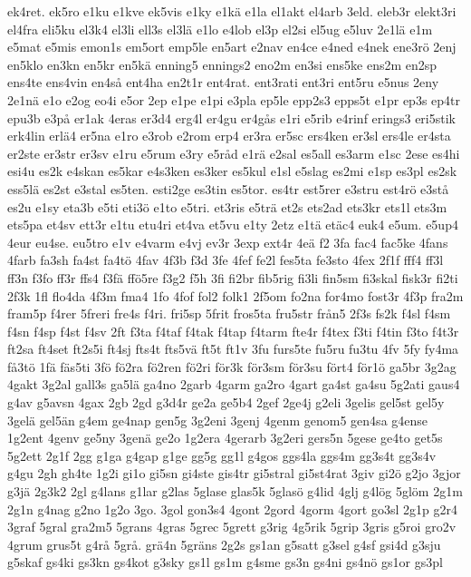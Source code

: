 {ek4ret.
ek5ro
e1ku
e1kve
ek5vis
e1ky
e1kä
e1la
el1akt
el4arb
3eld.
eleb3r
elekt3ri
el4fra
eli5ku
el3k4
el3li
ell3s
el3lä
e1lo
e4lob
el3p
el2si
el5ug
e5luv
2e1lä
e1m
e5mat
e5mis
emon1s
em5ort
emp5le
en5art
e2nav
en4ce
e4ned
e4nek
ene3rö
2enj
en5klo
en3kn
en5kr
en5kä
enning5
ennings2
eno2m
en3si
ens5ke
ens2m
en2sp
ens4te
ens4vin
en4så
ent4ha
en2t1r
ent4rat.
ent3rati
ent3ri
ent5ru
e5nus
2eny
2e1nä
e1o
e2og
eo4i
e5or
2ep
e1pe
e1pi
e3pla
ep5le
epp2s3
epps5t
e1pr
ep3s
ep4tr
epu3b
e3på
er1ak
4eras
er3d4
erg4l
er4gu
er4gås
e1ri
e5rib
e4rinf
erings3
eri5stik
erk4lin
erlä4
er5na
e1ro
e3rob
e2rom
erp4
er3ra
er5sc
ers4ken
er3sl
ers4le
er4sta
er2ste
er3str
er3sv
e1ru
e5rum
e3ry
e5råd
e1rä
e2sal
es5all
es3arm
e1sc
2ese
es4hi
esi4u
es2k
e4skan
es5kar
e4s3ken
es3ker
es5kul
e1sl
e5slag
es2mi
e1sp
es3pl
es2sk
ess5lä
es2st
e3stal
es5ten.
esti2ge
es3tin
es5tor.
es4tr
est5rer
e3stru
est4rö
e3stå
es2u
e1sy
eta3b
e5ti
eti3ö
e1to
e5tri.
et3ris
e5trä
et2s
ets2ad
ets3kr
ets1l
ets3m
ets5pa
et4sv
ett3r
e1tu
etu4ri
et4va
et5vu
e1ty
2etz
e1tä
etäc4
euk4
e5um.
e5up4
4eur
eu4se.
eu5tro
e1v
e4varm
e4vj
ev3r
3exp
ext4r
4eä
f2
3fa
fac4
fac5ke
4fans
4farb
fa3sh
fa4st
fa4tö
4fav
4f3b
f3d
3fe
4fef
fe2l
fes5ta
fe3sto
4fex
2f1f
fff4
ff3l
ff3n
f3fo
ff3r
ffs4
f3fä
ffö5re
f3g2
f5h
3fi
fi2br
fib5rig
fi3li
fin5sm
fi3skal
fisk3r
fi2ti
2f3k
1fl
flo4da
4f3m
fma4
1fo
4fof
fol2
folk1
2f5om
fo2na
for4mo
fost3r
4f3p
fra2m
fram5p
f4rer
5freri
fre4s
f4ri.
fri5sp
5frit
fros5ta
fru5str
från5
2f3s
fs2k
f4sl
f4sm
f4sn
f4sp
f4st
f4sv
2ft
f3ta
f4taf
f4tak
f4tap
f4tarm
fte4r
f4tex
f3ti
f4tin
f3to
f4t3r
ft2sa
ft4set
ft2s5i
ft4sj
fts4t
fts5vä
ft5t
ft1v
3fu
furs5te
fu5ru
fu3tu
4fv
5fy
fy4ma
få3tö
1fä
fäs5ti
3fö
fö2ra
fö2ren
fö2ri
för3k
för3sm
för3su
fört4
för1ö
ga5br
3g2ag
4gakt
3g2al
gall3s
ga5lä
ga4no
2garb
4garm
ga2ro
4gart
ga4st
ga4su
5g2ati
gaus4
g4av
g5avsn
4gax
2gb
2gd
g3d4r
ge2a
ge5b4
2gef
2ge4j
g2eli
3gelis
gel5st
gel5y
3gelä
gel5än
g4em
ge4nap
gen5g
3g2eni
3genj
4genm
genom5
gen4sa
g4ense
1g2ent
4genv
ge5ny
3genä
ge2o
1g2era
4gerarb
3g2eri
gers5n
5gese
ge4to
get5s
5g2ett
2g1f
2gg
g1ga
g4gap
g1ge
gg5g
gg1l
g4gos
ggs4la
ggs4m
gg3s4t
gg3s4v
g4gu
2gh
gh4te
1g2i
gi1o
gi5sn
gi4ste
gis4tr
gi5stral
gi5st4rat
3giv
gi2ö
g2jo
3gjor
g3jä
2g3k2
2gl
g4lans
g1lar
g2las
5glase
glas5k
5glasö
g4lid
4glj
g4lög
5glöm
2g1m
2g1n
g4nag
g2no
1g2o
3go.
3gol
gon3s4
4gont
2gord
4gorm
4gort
go3sl
2g1p
g2r4
3graf
5gral
gra2m5
5grans
4gras
5grec
5grett
g3rig
4g5rik
5grip
3gris
g5roi
gro2v
4grum
grus5t
g4rå
5grå.
grä4n
5gräns
2g2s
gs1an
g5satt
g3sel
g4sf
gsi4d
g3sju
g5skaf
gs4ki
gs3kn
gs4kot
g3sky
gs1l
gs1m
g4sme
gs3n
gs4ni
gs4nö
gs1or
gs3pl
}
